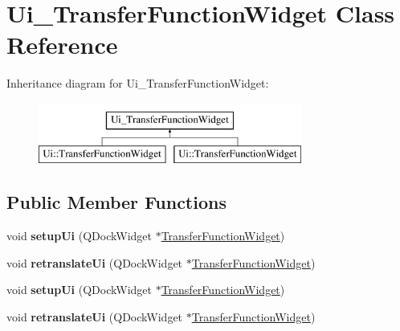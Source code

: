 \hypertarget{class_ui___transfer_function_widget}{\section{\-Ui\-\_\-\-Transfer\-Function\-Widget \-Class \-Reference}
\label{class_ui___transfer_function_widget}
}
\-Inheritance diagram for \-Ui\-\_\-\-Transfer\-Function\-Widget\-:\begin{figure}[H]
\begin{center}
\leavevmode
\includegraphics[height=2.000000cm]{class_ui___transfer_function_widget}
\end{center}
\end{figure}
\subsection*{\-Public \-Member \-Functions}
\begin{DoxyCompactItemize}
\item 
\hypertarget{class_ui___transfer_function_widget_adeb9ff963278c092b17440520ee9a523}{void {\bfseries setup\-Ui} (\-Q\-Dock\-Widget $\ast$\hyperlink{class_transfer_function_widget}{\-Transfer\-Function\-Widget})}\label{class_ui___transfer_function_widget_adeb9ff963278c092b17440520ee9a523}

\item 
\hypertarget{class_ui___transfer_function_widget_ad640d0720646d1f25d3a70b319980584}{void {\bfseries retranslate\-Ui} (\-Q\-Dock\-Widget $\ast$\hyperlink{class_transfer_function_widget}{\-Transfer\-Function\-Widget})}\label{class_ui___transfer_function_widget_ad640d0720646d1f25d3a70b319980584}

\item 
\hypertarget{class_ui___transfer_function_widget_adeb9ff963278c092b17440520ee9a523}{void {\bfseries setup\-Ui} (\-Q\-Dock\-Widget $\ast$\hyperlink{class_transfer_function_widget}{\-Transfer\-Function\-Widget})}\label{class_ui___transfer_function_widget_adeb9ff963278c092b17440520ee9a523}

\item 
\hypertarget{class_ui___transfer_function_widget_ad640d0720646d1f25d3a70b319980584}{void {\bfseries retranslate\-Ui} (\-Q\-Dock\-Widget $\ast$\hyperlink{class_transfer_function_widget}{\-Transfer\-Function\-Widget})}\label{class_ui___transfer_function_widget_ad640d0720646d1f25d3a70b319980584}

\end{DoxyCompactItemize}
